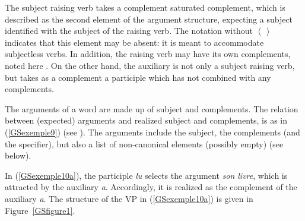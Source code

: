 \documentclass[output=paper
                ,modfonts
                ,nonflat
	        ,collection
	        ,collectionchapter
	        ,collectiontoclongg
 	        ,biblatex
                ,babelshorthands
                ,newtxmath
                ,draftmode
                ,colorlinks, citecolor=brown
]{./langsci/langscibook}
\begin{document}
{\begin{exe}
\begin{xlist}
	\end{xlist}
\end{exe}

The subject raising verb takes a complement saturated complement, which is described as the second element of the argument structure, expecting a subject  identified with the subject of the raising verb. The notation  without $\left< \, \right>$ indicates that this element may be absent: it is meant to accommodate subjectless verbs. In addition, the raising verb may have its own complements, noted here . On the other hand, the auxiliary is not only a subject raising verb, but takes as a complement a participle which has not combined with any complements.

The arguments of a word are made up of subject and complements. The relation between (expected) arguments and realized subject and complements, is as in (\ref{GSexemple9}) (see \citealt{GSag2000a-u, BMS2001a-unlinked}). The arguments include the subject, the complements (and the specifier), but also a list of non-canonical elements (possibly empty) (see below).

\begin{exe}
\end{exe}

In (\ref{GSexemple10a}), the participle \emph{lu} selects the argument \emph{son livre}, which is attracted by the auxiliary \emph{a}.
Accordingly, it is realized as the complement of the auxiliary \emph{a}. The structure of the VP in (\ref{GSexemple10a}) is given in Figure~\ref{GSfigure1}.

}
\end{document}
